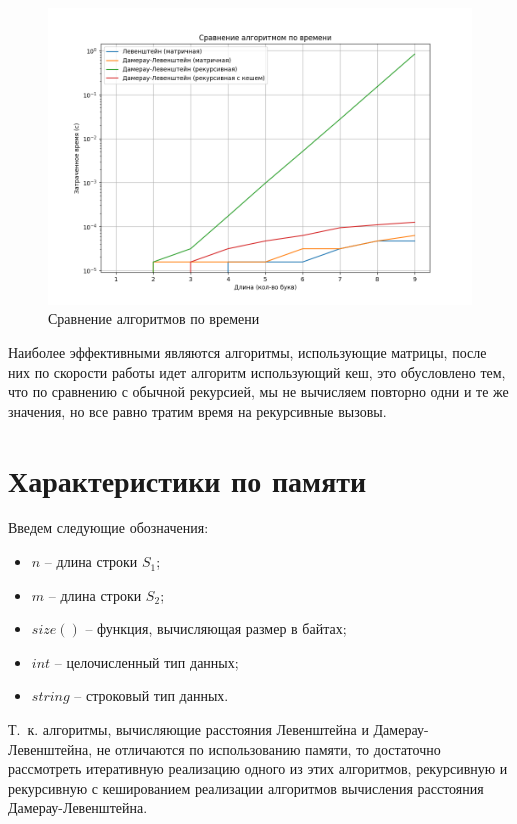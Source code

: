 \begin{figure}[h]
	\centering
	\includegraphics[width=0.7\textheight]{img/Figure_1.png}
	\caption{Сравнение алгоритмов по времени}
	\label{img:time}
\end{figure}

\clearpage

Наиболее эффективными являются алгоритмы, использующие матрицы, после них по скорости работы идет алгоритм использующий кеш, это обусловлено тем, что по сравнению с обычной рекурсией, мы не вычисляем повторно одни и те же значения, но все равно тратим время на рекурсивные вызовы. 

\section{Характеристики по памяти}

\label{memory}

Введем следующие обозначения:
\begin{itemize}
	\item $n$ -- длина строки $S_1$;
	\item $m$ -- длина строки $S_2$;
	\item $size()$ -- функция, вычисляющая размер в байтах;
	\item $int$ -- целочисленный тип данных;
	\item $string$ -- строковый тип данных.
\end{itemize}

Т.~к. алгоритмы, вычисляющие расстояния Левенштейна и Дамерау-Левенштейна, не отличаются по использованию памяти, то достаточно рассмотреть итеративную реализацию одного из этих алгоритмов, рекурсивную и рекурсивную с кешированием реализации алгоритмов вычисления расстояния Дамерау-Левенштейна.


